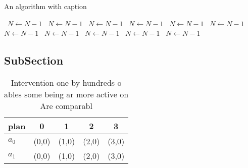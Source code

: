 \documentclass[a4paper]{article}
\begin{document}
\begin{algorithm}
\caption{An algorithm with caption}
\begin{algorithmic}
\    \State $N \gets N - 1$
\    \State $N \gets N - 1$
\    \State $N \gets N - 1$
\    \State $N \gets N - 1$
\    \State $N \gets N - 1$
\    \State $N \gets N - 1$
\    \State $N \gets N - 1$
\    \State $N \gets N - 1$
\    \State $N \gets N - 1$
\    \State $N \gets N - 1$
\    \State $N \gets N - 1$
\EndWhile
\end{algorithmic}
\end{algorithm}

\subsection{SubSection}

\begin{table}
\begin{adjustbox}{width=0.5\columnwidth}
\begin{tabular}{|l|l|l|l|l|}
\hline
\textbf{plan} & \multicolumn{1}{c|}{\textbf{0}} & \multicolumn{1}{c|}{\textbf{1}} & \multicolumn{1}{c|}{\textbf{2}} & \multicolumn{1}{c|}{\textbf{3}} \\ \hline
\textbf{$a_0$}  & (0,0) & (1,0) & (2,0) & (3,0) \\ \hline
\textbf{$a_1$}  & (0,0) & (1,0) & (2,0) & (3,0) \\ \hline
\end{tabular}
\end{adjustbox}
\caption{Intervention one by hundreds o ables some being ar more active on Are comparabl
}
\end{table}
\end{document}
